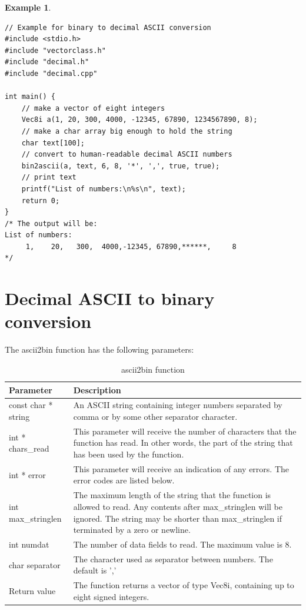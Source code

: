 \documentclass[11pt,a4paper,oneside,openright]{report}
\newtheorem{example}{Example}[chapter]  %
\newcommand{\vspacesmall}{\vspace{3mm}}
\begin{document}
\begin{example}
\label{example1}
\end{example} %
\begin{lstlisting}[frame=single]
// Example for binary to decimal ASCII conversion
#include <stdio.h>
#include "vectorclass.h"        
#include "decimal.h" 
#include "decimal.cpp"

int main() {
    // make a vector of eight integers
    Vec8i a(1, 20, 300, 4000, -12345, 67890, 1234567890, 8);
    // make a char array big enough to hold the string
    char text[100];
    // convert to human-readable decimal ASCII numbers
    bin2ascii(a, text, 6, 8, '*', ',', true, true);
    // print text
    printf("List of numbers:\n%s\n", text);
    return 0;
}
/* The output will be:
List of numbers:
     1,    20,   300,  4000,-12345, 67890,******,     8
*/    

\end{lstlisting}
\vspacesmall



\chapter{Decimal ASCII to binary conversion}\label{chap:a2bConversion}

The ascii2bin function has the following parameters:

\begin {table}[H]
\caption{ascii2bin function}
\label{table:ascii2binFunction}
\begin{tabular}{|p{32mm}|p{120mm}|}
\hline
\bfseries Parameter & \bfseries Description \\ \hline
const char * string & An ASCII string containing integer numbers separated by comma or by some other separator character. \\ \hline
int * chars\_read & This parameter will receive the number of characters that the function has read. In other words, the part of the string that has been used by the function. \\ \hline
int * error & This parameter will receive an indication of any errors. The error codes are listed below. \\ \hline
int max\_stringlen & The maximum length of the string that the function is allowed to read. Any contents after max\_stringlen will be ignored.
The string may be shorter than max\_stringlen if terminated by a zero or newline. \\ \hline
int numdat & The number of data fields to read. The maximum value is 8. \\ \hline
char separator & The character used as separator between numbers. The default is ',' \\ \hline
Return value & The function returns a vector of type Vec8i, containing up to eight signed integers. \\ \hline
\end{tabular}
\end{table}
\vspacesmall
\end{document}
